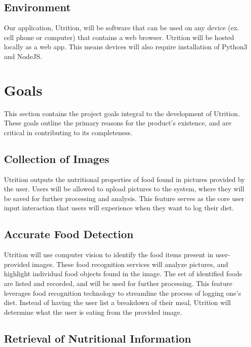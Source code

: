 \documentclass{article}
\begin{document}
\subsection{Environment}

Our application, Utrition, will be software that can be used on any device (ex. cell phone or computer) that contains a web browser. Utrition will be hosted locally as a web app. This means devices will also require installation of Python3 and NodeJS.

\section{Goals}

This section contains the project goals integral to the development of 
Utrition. These goals outline the primary reasons for the product's existence, 
and are critical in contributing to its completeness.

\subsection{Collection of Images}

Utrition outputs the nutritional properties of food found in pictures 
provided by the user. Users will be allowed to upload pictures to the system, 
where they will be saved for further processing and analysis. This feature 
serves as the core user input interaction that users will experience when they 
want to log their diet.

\subsection{Accurate Food Detection}

Utrition will use computer vision to identify the food items present in 
user-provided images. These food recognition services will analyze pictures, 
and highlight individual food objects found in the image. The set of identified 
foods are listed and recorded, and will be used for further processing. This 
feature leverages food recognition technology to streamline the process of 
logging one's diet. Instead of having the user list a breakdown of their meal, 
Utrition will determine what the user is eating from the provided image.

\subsection{Retrieval of Nutritional Information}
\end{document}
